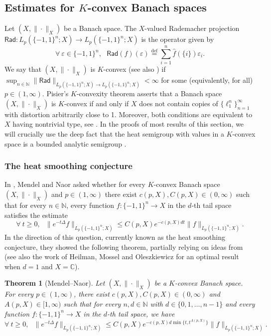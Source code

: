 \documentclass[11pt,reqno]{amsart}
\renewcommand{\leq}{\leqslant}
\renewcommand{\geq}{\geqslant}
\newcommand{\e}{\varepsilon}
\newcommand{\1}{\mathbf 1}
\newtheorem{theorem}{Theorem}
\theoremstyle{remark}
\newcommand{\C}{\mathbb C}
\newcommand{\N}{\mathbb N}
\newcommand{\eqdef}{\stackrel{\mathrm{def}}{=}}
\newcommand{\msf}{\mathsf}
\begin{document}

\subsection{Estimates for $K$-convex Banach spaces} \label{subsec:1.2} Let $(X,\|\cdot\|_X)$ be a Banach space. The $X$-valued Rademacher projection $\msf{Rad}:L_p(\{-1,1\}^n;X)\to L_p(\{-1,1\}^n;X)$ is the operator given by
\begin{equation}
\forall \ \e\in\{-1,1\}^n, \ \ \ \msf{Rad}(f)(\e) \eqdef \sum_{i=1}^n \widehat{f}(\{i\}) \e_i.
\end{equation}
We say that $(X,\|\cdot\|_X)$ is $K$-convex (see also \cite{Mau03}) if $\sup_{n\in\N} \|\msf{Rad}\|_{L_p(\{-1,1\}^n;X)\to L_p(\{-1,1\}^n;X)} < \infty$ for some (equivalently, for all) $p\in(1,\infty)$. Pisier's $K$-convexity theorem \cite{Pis82} asserts that a Banach space $(X,\|\cdot\|_X)$ is $K$-convex if and only if $X$ does not contain copies of $\{\ell_1^n\}_{n=1}^\infty$ with distortion arbitrarily close to 1. Moreover, both conditions are equivalent to $X$ having nontrivial type, see \cite{Pis73}. In the proofs of most results of this section, we will crucially use the deep fact that the heat semigroup with values in a $K$-convex space is a bounded analytic semigroup \cite{Pis82}.

\subsubsection{The heat smoothing conjecture} In \cite{MN14}, Mendel and Naor asked whether for every $K$-convex Banach space $(X,\|\cdot\|_X)$ and $p\in(1,\infty)$ there exist $c(p,X), C(p,X)\in(0,\infty)$ such that for every $n\in\N$, every function $f:\{-1,1\}^n\to X$ in the $d$-th tail space satisfies the estimate
\begin{equation}
\forall \ t\geq0, \ \ \ \|e^{-t\Delta}f\|_{L_p(\{-1,1\}^n;X)} \leq C(p,X)e^{-c(p,X)dt} \|f\|_{L_p(\{-1,1\}^n;X)}.
\end{equation}
In the direction of this question, currently known as the heat smoothing conjecture, they showed the following theorem, partially relying on ideas from \cite{Pis07} (see also the work \cite{HMO17} of Heilman, Mossel and Oleszkiewicz for an optimal result when $d=1$ and $X=\C$).

\begin{theorem} [Mendel--Naor] \label{thm:mendel-naor}
Let $(X,\|\cdot\|_X)$ be a $K$-convex Banach space. For every $p\in(1,\infty)$, there exist $c(p,X), C(p,X)\in(0,\infty)$ and $A(p,X)\in[1,\infty)$ such that for every $n,d\in\N$ with $d\in\{0,1,\ldots,n-1\}$ and every function $f:\{-1,1\}^n\to X$ in the $d$-th tail space, we have
\begin{equation} \label{eq:mendel-naor}
\forall \ t\geq0, \ \ \ \|e^{-t\Delta}f\|_{L_p(\{-1,1\}^n;X)} \leq C(p,X)e^{-c(p,X)d\min\{t,t^{A(p,X)}\}} \|f\|_{L_p(\{-1,1\}^n;X)}.
\end{equation}
\end{theorem}
\end{document}

